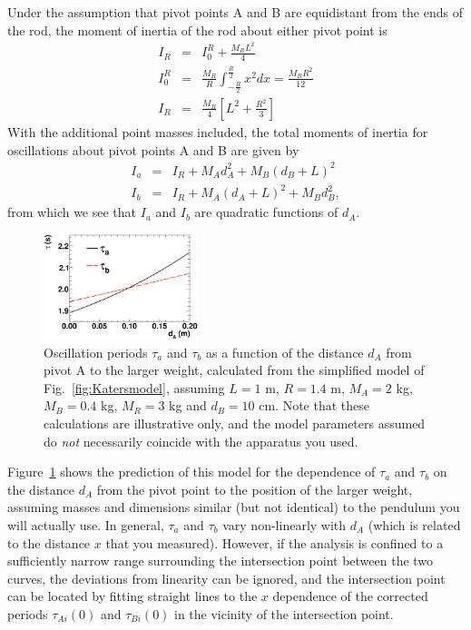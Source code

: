 \documentclass{revtex4}
\begin{document}
Under the assumption that pivot points A and B are equidistant from the ends of the rod, the moment of inertia of the rod about either pivot point is 
\begin{eqnarray}
  I_R &=& I_0^R + \frac{M_RL^2}{4} \nonumber \\
  I_0^R &=& \frac{M_R}{R}\int_{-\frac{R}{2}}^{\frac{R}{2}} x^2 dx = \frac{M_R R^2}{12} \nonumber \\
  I_R &=& \frac{M_R}{4}\left[L^2 + \frac{R^2}{3}\right]
\end{eqnarray}
With the additional point masses included, the total moments of inertia for oscillations about pivot points A and B are given by
\begin{eqnarray}
  I_a &=& I_R + M_A d_A^2 + M_B (d_B + L)^2 \nonumber \\
  I_b &=& I_R + M_A (d_A + L)^2 + M_B d_B^2, 
\end{eqnarray}
from which we see that $I_a$ and $I_b$ are quadratic functions of $d_A$.
\begin{figure}[h]
  \begin{center}
    \includegraphics[width=0.4\textwidth]{KatersModelFig2.eps}
  \end{center}
  \caption{\label{fig:Katers_model_predict} Oscillation periods $\tau_a$ and $\tau_b$ as a function of the distance $d_A$ from pivot A to the larger weight, calculated from the simplified model of Fig.~\ref{fig:Katersmodel}, assuming $L = 1$ m, $R = 1.4$ m, $M_A = 2$ kg, $M_B = 0.4$ kg, $M_R = 3$ kg and $d_B = 10$ cm. Note that these calculations are illustrative only, and the model parameters assumed do \emph{not} necessarily coincide with the apparatus you used.}
\end{figure}
Figure~\ref{fig:Katers_model_predict} shows the prediction of this model for the dependence of $\tau_a$ and $\tau_b$ on the distance $d_A$ from the pivot point to the position of the larger weight, assuming masses and dimensions similar (but not identical) to the pendulum you will actually use. In general, $\tau_a$ and $\tau_b$ vary non-linearly with $d_A$ (which is related to the distance $x$ that you measured). However, if the analysis is confined to a sufficiently narrow range surrounding the intersection point between the two curves, the deviations from linearity can be ignored, and the intersection point can be located by fitting straight lines to the $x$ dependence of the corrected periods $\tau_{Ai}(0)$ and $\tau_{Bi}(0)$ in the vicinity of the intersection point.
\end{document}
